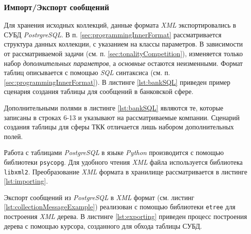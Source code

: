     \subsubsection{Импорт/Экспорт сообщений}
    \label{sec:devImporting}
    Для хранения исходных коллекций, данные формата {\it XML} экспортировались в
    СУБД {\it PostrgreSQL}.
    В п. \ref{sec:programmingInnerFormat} рассматривается структура данных
    коллекции, с указанием на классы параметров.
    В зависимости от рассматриваемой задачи (см. п. \ref{sec:tonalityCompetition}),
    изменяется только набор {\it дополнительных параметров}, а {\it основные} остаются
    неизменными.
    Формат таблиц описывается с помощью {\it SQL} синтаксиса (см. п.
    \ref{sec:programmingInnerFormat}).
    В листинге \ref{lst:bankSQL} приведен пример сценария создания таблицы
    для сообщений в банковской сфере.


    \lstset{language=sql}
    

    Дополнительными полями в листинге \ref{lst:bankSQL} являются те,
    которые записаны в строках 6-13 и указывают на рассматриваемые компании.
    Сценарий создания таблицы для сферы ТКК отличается лишь набором дополнительных
    полей.

    Работа с таблицами {\it PostgreSQL} в языке {\it Python} производится с помощью
    библиотеки {\tt psycopg}.
    Для удобного чтения {\it XML} файла используется библиотека {\tt libxml2}.
    Преобразование {\it XML} формата в хранилище рассматривается в листинге
    \ref{lst:importing}.

    \lstset{style=python}
    

    Экспорт сообщений из {\it PostgreSQL} в {\it XML} формат (см. листинг
    \ref{lst:collectionMessageExample}) реализован с помощью библиотеки {\tt etree}
    для построения {\it XML} дерева.
    В листинге \ref{lst:exporting} приведен процесс построения дерева с помощью
    курсора, созданного для обхода таблицы СУБД.

